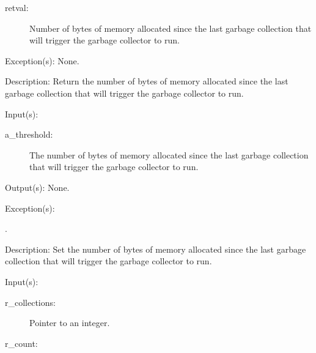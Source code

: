 \begin{capi}
\begin{capilist}
		\begin{description}\item[]
		\item[retval: ]
			Number of bytes of memory allocated since the last
			garbage collection that will trigger the garbage
			collector to run.
		\end{description}
	\item[Exception(s): ] None.
	\item[Description: ]
		Return the number of bytes of memory allocated since the last
		garbage collection that will trigger the garbage collector to
		run.
	\end{capilist}
\label{nxa_threshold_set}
	\begin{capilist}
	\item[Input(s): ]
		\begin{description}\item[]
		\item[a\_threshold: ]
			The number of bytes of memory allocated since the last
			garbage collection that will trigger the garbage
			collector to run.
		\end{description}
	\item[Output(s): ] None.
	\item[Exception(s): ]
		\begin{description}\item[]
		\item[.]
		\end{description}
	\item[Description: ]
		Set the number of bytes of memory allocated since the last
		garbage collection that will trigger the garbage collector to
		run.
	\end{capilist}
\label{nxa_stats_get}
	\begin{capilist}
	\item[Input(s): ]
		\begin{description}\item[]
		\item[r\_collections: ]
			Pointer to an integer.
		\item[r\_count: ]

\end{description}
\end{capilist}
\end{capi}
